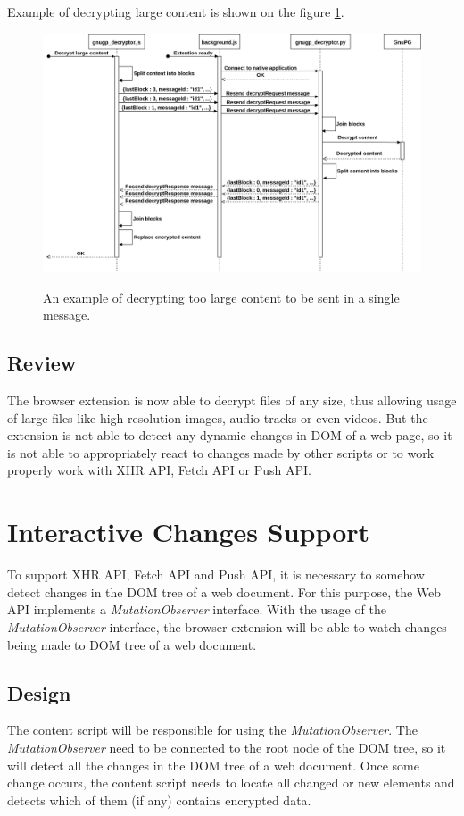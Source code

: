Example of decrypting large content is shown on the figure \ref{img:messageDraft}.
\begin{figure}[H]
    \begin{center}
        \label{img:messageDraft}
        \includegraphics[width=1.3\textwidth,angle=90]{obrazky-figures/sequence-messageDesign.png}
        \caption{An example of decrypting too large content to be sent in a single message.}
    \end{center}
\end{figure}

\subsection{Review}
The browser extension is now able to decrypt files of any size, thus allowing usage of large files like high-resolution images, audio tracks or even videos. But the extension is not able to detect any dynamic changes in DOM of a web page, so it is not able to appropriately react to changes made by other scripts or to work properly work with XHR API, Fetch API or Push API.

\section{Interactive Changes Support}
To support XHR API, Fetch API and Push API, it is necessary to somehow detect changes in the DOM tree of a web document. For this purpose, the Web API implements a \textit{MutationObserver} interface. With the usage of the \textit{MutationObserver} interface, the browser extension will be able to watch changes being made to DOM tree of a web document.

\subsection{Design}
The content script will be responsible for using the \textit{MutationObserver}. The \textit{MutationObserver} need to be connected to the root node of the DOM tree, so it will detect all the changes in the DOM tree of a web document. Once some change occurs, the content script needs to locate all changed or new elements and detects which of them (if any) contains encrypted data.

